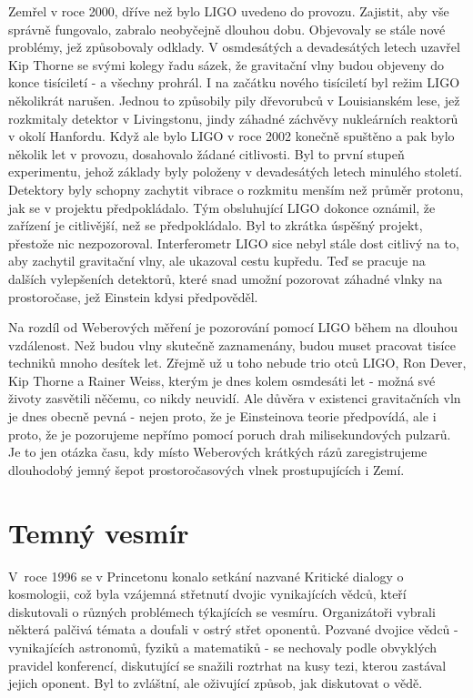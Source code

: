   Zemřel v roce 2000, dříve než bylo LIGO uvedeno do provozu. Zajistit, aby vše správně fungovalo,
  zabralo neobyčejně dlouhou dobu. Objevovaly se stále nové problémy, jež způsobovaly odklady. V
  osmdesátých a devadesátých letech uzavřel Kip Thorne se svými kolegy řadu sázek, že gravitační
  vlny budou objeveny do konce tisíciletí - a všechny prohrál. I na začátku nového tisíciletí byl
  režim LIGO několikrát narušen. Jednou to způsobily pily dřevorubců v Louisianském lese, jež
  rozkmitaly detektor v Livingstonu, jindy záhadné záchvěvy nukleárních reaktorů v okolí Hanfordu.
  Když ale bylo LIGO v roce 2002 konečně spuštěno a pak bylo několik let v provozu, dosahovalo
  žádané citlivosti. Byl to první stupeň experimentu, jehož základy byly položeny v devadesátých
  letech minulého století. Detektory byly schopny zachytit vibrace o rozkmitu menším než průměr
  protonu, jak se v projektu předpokládalo. Tým obsluhující LIGO dokonce oznámil, že zařízení je
  citlivější, než se předpokládalo. Byl to zkrátka úspěšný projekt, přestože nic nezpozoroval.
  Interferometr LIGO sice nebyl stále dost citlivý na to, aby zachytil gravitační vlny, ale ukazoval
  cestu kupředu. Teď se pracuje na dalších vylepšeních detektorů, které snad umožní pozorovat
  záhadné vlnky na prostoročase, jež Einstein kdysi předpověděl. 
  
  Na rozdíl od Weberových měření je pozorování pomocí LIGO během na dlouhou vzdálenost. Než budou
  vlny skutečně zaznamenány, budou muset pracovat tisíce techniků mnoho desítek let. Zřejmě už u
  toho nebude trio otců LIGO, Ron Dever, Kip Thorne a Rainer Weiss, kterým je dnes kolem osmdesáti
  let - možná své životy zasvětili něčemu, co nikdy neuvidí. Ale důvěra v existenci gravitačních vln
  je dnes obecně pevná - nejen proto, že je Einsteinova teorie předpovídá, ale i proto, že je
  pozorujeme nepřímo pomocí poruch drah milisekundových pulzarů. Je to jen otázka času, kdy místo
  Weberových krátkých rázů zaregistrujeme dlouhodobý jemný šepot prostoročasových vlnek
  prostupujících i Zemí.

\section{Temný vesmír}\label{feyIchIIIsecXII}
  V roce 1996 se v Princetonu konalo setkání nazvané Kritické dialogy o kosmologii, což byla
  vzájemná střetnutí dvojic vynikajících vědců, kteří diskutovali o různých problémech týkajících se
  vesmíru. Organizátoři vybrali některá palčivá témata a doufali v ostrý střet oponentů. Pozvané
  dvojice vědců - vynikajících astronomů, fyziků a matematiků - se nechovaly podle obvyklých
  pravidel konferencí, diskutující se snažili roztrhat na kusy tezi, kterou zastával jejich oponent.
  Byl to zvláštní, ale oživující způsob, jak diskutovat o vědě. 
  
